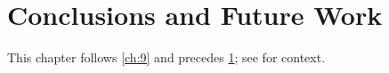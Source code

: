 \chapter{Conclusions and Future Work}\label{ch:10}
\kant[6-11]

This chapter follows \cref{ch:9} and precedes \cref{ch:10}; see \citep{main-1,main-3} for context.
